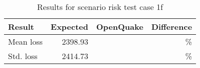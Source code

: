 \begin{table}[htbp]

\centering
\begin{tabular}{ l r r r }

\hline
\rowcolor{anti-flashwhite}
\bf{Result} & \bf{Expected} & \bf{OpenQuake} & \bf{Difference}\\
\hline
Mean loss & 2398.93 &  & \% \\
Std. loss & 2414.73 &  & \% \\
\hline
\end{tabular}

\caption{Results for scenario risk test case 1f}
\label{tab:result-scenario-risk-1f}
\end{table}